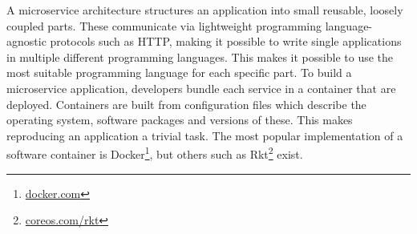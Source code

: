 A microservice architecture structures an application into small reusable,
loosely coupled parts. These communicate via lightweight programming
language-agnostic protocols such as HTTP, making it possible to write single
applications in multiple different programming languages. This makes it possible
to use the most suitable programming language for each specific part. To build a
microservice application, developers bundle each service in a container that are
deployed. Containers are built from configuration files which describe the
operating system, software packages and versions of these. This makes
reproducing an application a trivial task. The most popular implementation of a
software container is Docker\footnote{\url{docker.com}}, but others such as
Rkt\footnote{\url{coreos.com/rkt}} exist.  


% 

